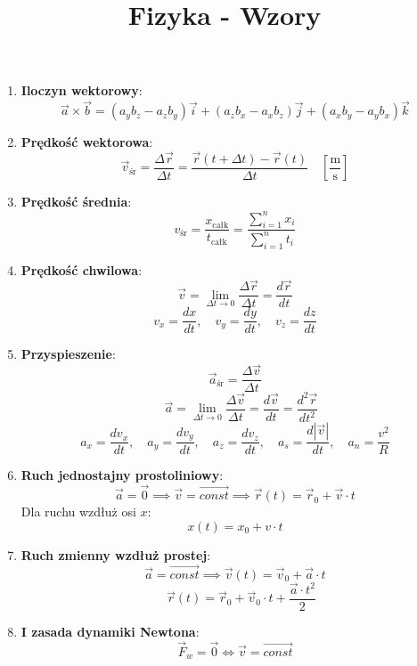 \documentclass{article}
\author{}
\title{Fizyka - Wzory}
\date{}
\begin{document}
	\maketitle
	
	\begin{enumerate}
		
		\item \textbf{Iloczyn wektorowy}:
		\[
		\vec{a} \times \vec{b} = (a_yb_z - a_zb_y)\vec{i} + (a_zb_x - a_xb_z)\vec{j} + (a_xb_y - a_yb_x)\vec{k}
		\]
		
		\item \textbf{Prędkość wektorowa}:
		\[
		\vec{v}_\text{śr} = \frac{\Delta\vec{r}}{\Delta t} = \frac{\vec{r}(t + \Delta t) - \vec{r}(t)}{\Delta t} \quad \left[\frac{\text{m}}{\text{s}}\right]
		\]
		
		\item \textbf{Prędkość średnia}:
		\[
		v_\text{śr} = \frac{x_\text{całk}}{t_\text{całk}} = \frac{\sum \limits_{i=1}^{n}x_i}{\sum \limits_{i=1}^{n}t_i}
		\]
		
		\item \textbf{Prędkość chwilowa}:
		\[
		\vec{v} = \lim_{\Delta t \to 0} \frac{\Delta \vec{r}}{\Delta t} = \frac{d \vec{r}}{dt}
		\]
		\[
		v_x = \frac{dx}{dt}, \quad v_y = \frac{dy}{dt}, \quad v_z = \frac{dz}{dt}
		\]
		
		\item \textbf{Przyspieszenie}:
		\[
		\vec{a}_\text{śr} = \frac{\Delta \vec{v}}{\Delta t}
		\]
		\[
		\quad 
		\vec{a} = \lim_{\Delta t \to 0} \frac{\Delta \vec{v}}{\Delta t} = \frac{d \vec{v}}{dt} = \frac{d^2 \vec{r}}{dt^2}
		\]
		\[
		a_x = \frac{dv_x}{dt}, \quad a_y = \frac{dv_y}{dt}, \quad a_z = \frac{dv_z}{dt}, \quad a_s = \frac{d|\vec{v}|}{dt}, \quad a_n = \frac{v^2}{R}
		\]
		
		\item \textbf{Ruch jednostajny prostoliniowy}:
		\[
		\vec{a} = \vec{0} \implies \vec{v} = \overrightarrow{const} \implies \vec{r}(t) = \vec{r}_0 + \vec{v} \cdot t
		\]
		Dla ruchu wzdłuż osi \(x\):
		\[
		x(t) = x_0 + v \cdot t
		\]
		
		\item \textbf{Ruch zmienny wzdłuż prostej}:
		\[
		\vec{a} = \overrightarrow{const} \implies \vec{v}(t) = \vec{v}_0 + \vec{a} \cdot t
		\]
		\[\quad \vec{r}(t) = \vec{r}_0 + \vec{v}_0 \cdot t + \frac{\vec{a} \cdot t^2}{2}
		\]
		
		\item \textbf{I zasada dynamiki Newtona}:
		\[
		\vec{F}_w = \vec{0} \iff \vec{v} = \overrightarrow{const}
		\]
		

\end{enumerate}
\end{document}
